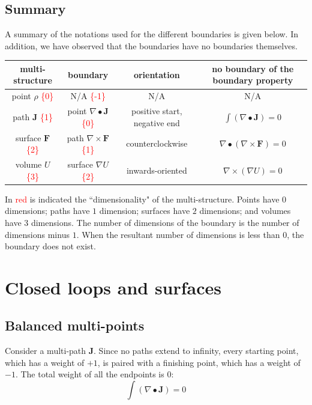 \documentclass{book}
\newcommand{\red}[1]{\textcolor{red}{#1}}
\begin{document}
\section{Summary}

A summary of the notations used for the different boundaries is given below. In addition, we have observed that the boundaries have no boundaries themselves.

\begin{center}
\begin{tabular}{|c||c|c|c|}
\hline
multi-structure & boundary & orientation & no boundary of the boundary property \\
\hline
\hline
point \(\rho\) \red{\{0\}} &
N/A \red{\{-1\}} &
N/A & 
N/A \\ 
\hline 
path \(\mathbf{J}\) \red{\{1\}} & 
point \(\nabla \bullet \mathbf{J}\) \red{\{0\}} & 
positive start, negative end &
\(\int (\nabla \bullet \mathbf{J}) = 0\) \\
\hline
surface \(\mathbf{F}\) \red{\{2\}} & 
path \(\nabla \times \mathbf{F}\) \red{\{1\}} & 
counterclockwise &
\(\nabla \bullet (\nabla \times \mathbf{F}) = 0\) \\
\hline
volume \(U\) \red{\{3\}} & 
surface \(\nabla U\) \red{\{2\}} & 
inwards-oriented & 
\(\nabla \times (\nabla U) = 0\) \\
\hline
\end{tabular}
\end{center}

In \red{red} is indicated the ``dimensionality" of the multi-structure. Points have \(0\) dimensions; paths have \(1\) dimension; surfaces have \(2\) dimensions; and volumes have \(3\) dimensions. The number of dimensions of the boundary is the number of dimensions minus \(1\). When the resultant number of dimensions is less than \(0\), the boundary does not exist.





\chapter{Closed loops and surfaces}

\section{Balanced multi-points}

Consider a multi-path \(\mathbf{J}\). Since no paths extend to infinity, every starting point, which has a weight of \(+1\), is paired with a finishing point, which has a weight of \(-1\). The total weight of all the endpoints is \(0\):
\[\int (\nabla \bullet \mathbf{J}) = 0\]
\end{document}
